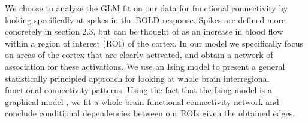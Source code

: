 \documentclass[12pt]{article}
\begin{document}
We choose to analyze the GLM fit on our data for functional connectivity by looking specifically at spikes in the BOLD response.  Spikes are defined more concretely in section 2.3, but can be thought of as an increase in blood flow within a region of interest (ROI) of the cortex.  %
In our model we specifically focus on areas of the cortex that are clearly activated, and obtain a network of association for these activations. We use an Ising model to present a general statistically principled approach for looking at whole brain interregional functional connectivity patterns. Using the fact that the Ising model is a graphical model \cite{kindermann1980markov}, we fit a whole brain functional connectivity network and conclude conditional dependencies between our ROIs given the obtained edges. 




\end{document}

